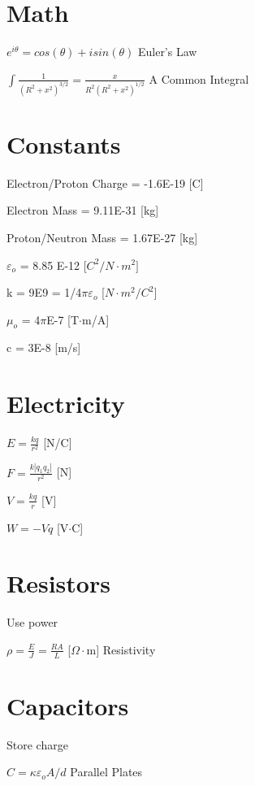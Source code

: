 \documentclass{article}
\begin{document}
\raggedright
\setlength{\parskip}{\baselineskip}%
\setlength{\parindent}{0pt}%
\section{Math}

\LARGE ${e^{i\theta}=cos(\theta)+isin(\theta)}$
\large Euler's Law

\LARGE ${\int \frac{1}{(R^2+x^2)^{3/2}}=\frac{x}{R^2(R^2+x^2)^{1/2}}}$
\large A Common Integral

\section{Constants}
\Large {Electron/Proton Charge = -1.6E-19 [C]}

\Large {Electron Mass = 9.11E-31 [kg]}

\Large {Proton/Neutron Mass = 1.67E-27 [kg]}

\Large {$\varepsilon_o$ = 8.85 E-12 [$C^2/N\cdot{m^2}]$}

\Large {k = 9E9 = 1/4$\pi\varepsilon_o$ [$N\cdot{m^2}/{C^2}]$}

\Large {$\mu_o$ = 4$\pi$E-7 [T$\cdot$m/A]}

\Large {c = 3E-8 [m/s]}


\section{Electricity}

\LARGE ${E=\frac{kq}{r^2}} $  \large{[N/C]}

\LARGE ${F=\frac{k|q_1q_2|}{r^2}}$ \large{[N]}

\LARGE ${V=\frac{kq}{r}}$ \large{[V]}

\LARGE ${W=-Vq}$ \large{[V$\cdot$C]}

\section{Resistors}

\large Use power

\LARGE ${\rho=\frac{E}{J}=\frac{RA}{L}}$ \large{[$\Omega\cdot$m]}
\large{Resistivity}

\section{Capacitors}

\large Store charge

\LARGE$C =\kappa\varepsilon_oA/d$
\large{Parallel Plates}
\end{document}
